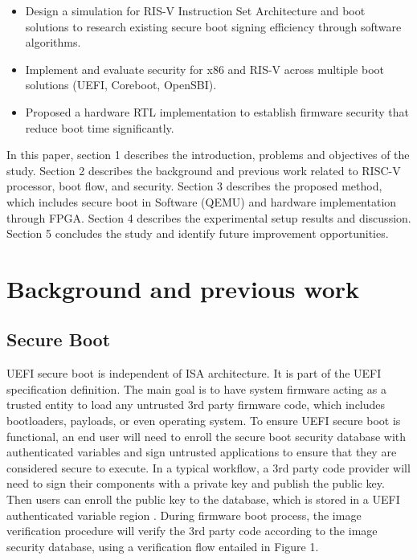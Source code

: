 \documentclass[review]{elsarticle}
\begin{document}
 \begin{itemize}
  \item Design a simulation for RIS-V Instruction Set Architecture and boot solutions to research existing secure boot signing efficiency through software algorithms.
  \item Implement and evaluate security for x86 and RIS-V across multiple boot solutions (UEFI, Coreboot, OpenSBI).
  \item Proposed a hardware RTL implementation to establish firmware security that reduce boot time significantly.
\end{itemize}

In this paper, section 1 describes the introduction, problems and objectives of the study.
Section 2 describes the background and previous work related to RISC-V processor, boot flow, and
security. Section 3 describes the proposed method, which includes secure boot in Software (QEMU)
and hardware implementation through FPGA. Section 4 describes the experimental setup results and
discussion. Section 5 concludes the study and identify future improvement opportunities.


\section{ Background and previous work}


\subsection{Secure Boot}
UEFI secure boot is independent of ISA architecture. It is part of the UEFI specification definition. The main goal is to have system firmware acting as a trusted entity to load any untrusted 3rd party firmware code, which includes bootloaders, payloads, or even operating system. To ensure UEFI secure boot is functional, an end user will need to enroll the secure boot security database with authenticated variables and sign untrusted applications to ensure that they are considered secure to execute.
In a typical workflow, a 3rd party code provider will need to sign their components with a private key and publish the public key. Then users can enroll the public key to the database, which is stored in a UEFI authenticated variable region \cite{R5:13}.  During firmware boot process, the image verification procedure will verify the 3rd party code according to the image security database, using a verification flow entailed in Figure 1.
\end{document}
